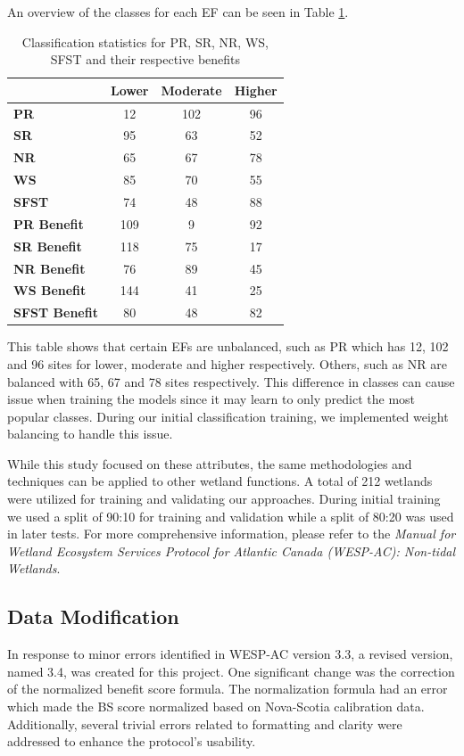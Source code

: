 \documentclass[12pt,letterpaper]{article}
\begin{document}
An overview of the classes for each \ac{EF} can be seen in Table \ref{tab:classification_statistics}.
\begin{table}[ht]
\centering
\begin{tabular}{lccc}
\hline
& \textbf{Lower} & \textbf{Moderate} & \textbf{Higher} \\
\hline
\textbf{PR}            & 12  & 102 & 96  \\
\textbf{SR}            & 95  & 63  & 52  \\
\textbf{NR}            & 65  & 67  & 78  \\
\textbf{WS}            & 85  & 70  & 55  \\
\textbf{SFST}          & 74  & 48  & 88  \\
\textbf{PR Benefit}   & 109 & 9   & 92  \\
\textbf{SR Benefit}   & 118 & 75  & 17  \\
\textbf{NR Benefit}   & 76  & 89  & 45  \\
\textbf{WS Benefit}   & 144 & 41  & 25  \\
\textbf{SFST Benefit} & 80  & 48  & 82  \\
\hline
\end{tabular}
\caption{Classification statistics for PR, SR, NR, WS, SFST and their respective benefits}
\label{tab:classification_statistics}
\end{table}

This table shows that certain \ac{EF}s are unbalanced, such as \ac{PR} which has 12, 102 and 96 sites for lower, moderate and higher respectively.
Others, such as \ac{NR} are balanced with 65, 67 and 78 sites respectively.
This difference in classes can cause issue when training the models since it may learn to only predict the most popular classes.
During our initial classification training, we implemented weight balancing to handle this issue.

While this study focused on these attributes, the same methodologies and techniques can be applied to other wetland functions.
A total of 212 wetlands were utilized for training and validating our approaches.
During initial training we used a split of 90:10 for training and validation while a split of 80:20 was used in later tests.
For more comprehensive information, please refer to the \textit{Manual for Wetland Ecosystem Services Protocol for Atlantic Canada (WESP-AC): Non-tidal Wetlands}.

\subsection{Data Modification}\label{sec:data_mod}
In response to minor errors identified in WESP-AC version 3.3, a revised version, named 3.4, was created for this project.
One significant change was the correction of the normalized benefit score formula.
The normalization formula had an error which made the \ac{BS} score normalized based on Nova-Scotia calibration data.
Additionally, several trivial errors related to formatting and clarity were addressed to enhance the protocol's usability.
\end{document}

